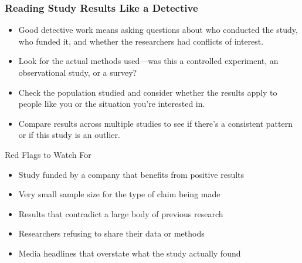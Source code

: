 \documentclass{beamer}
\begin{document}
	\begin{frame}
		\frametitle{Reading Study Results Like a Detective}
		
		\begin{itemize}
			\item Good detective work means asking questions about who conducted the study, who funded it, and whether the researchers had conflicts of interest.
			\item Look for the actual methods used—was this a controlled experiment, an observational study, or a survey?
			\item Check the population studied and consider whether the results apply to people like you or the situation you're interested in.
			\item Compare results across multiple studies to see if there's a consistent pattern or if this study is an outlier.
			\end{itemize}
				
			\begin{alertblock}{Red Flags to Watch For}
				\begin{itemize}
					\item Study funded by a company that benefits from positive results
					\item Very small sample size for the type of claim being made
					\item Results that contradict a large body of previous research
					\item Researchers refusing to share their data or methods
					\item Media headlines that overstate what the study actually found
					\end{itemize}
					\end{alertblock}
					
	\end{frame}
	
	
\end{document}

